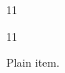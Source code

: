 \documentclass[paper=A4]{ropas-poster}
\begin{document}
\begin{postergrid}{1}{1}
\begin{posterblock}{1}{1}
\begin{trivlist}\item Plain item.\end{trivlist}
\end{posterblock}
\end{postergrid}
\end{document}
